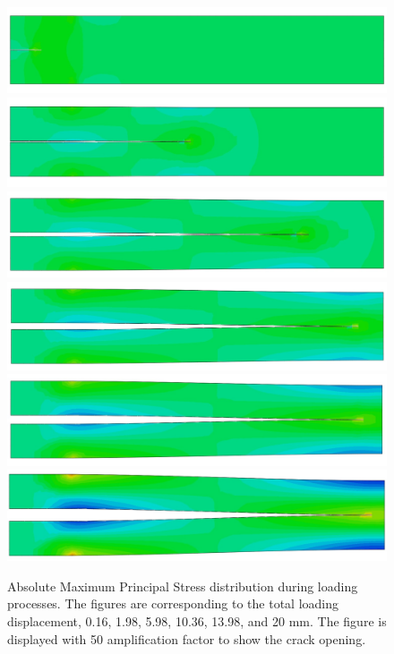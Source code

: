 \documentclass[preprint,review,12pt]{elsarticle}
\begin{document}
\begin{figure}[htbp]
\begin{minipage}[t]{0.28\textwidth}
\end{minipage}
\begin{minipage}[t]{0.65\textwidth}
\centering
\includegraphics[width=\textwidth]{Abaqus/XFEM/XFEM_1.jpg}
\includegraphics[width=\textwidth]{Abaqus/XFEM/XFEM_2.jpg}
\includegraphics[width=\textwidth]{Abaqus/XFEM/XFEM_3.jpg}
\includegraphics[width=\textwidth]{Abaqus/XFEM/XFEM_4.jpg}
\includegraphics[width=\textwidth]{Abaqus/XFEM/XFEM_5.jpg}
\includegraphics[width=\textwidth]{Abaqus/XFEM/XFEM_6.jpg}
\end{minipage}
\caption{Absolute Maximum Principal Stress distribution during loading processes. The figures are corresponding to the total loading displacement, 0.16, 1.98, 5.98, 10.36, 13.98, and 20 mm. The figure is displayed with 50 amplification factor to show the crack opening.}
\label{fig:XFEMResults}
\end{figure}
\end{document}
